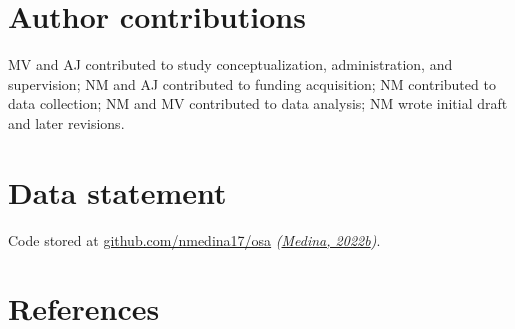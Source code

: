 \documentclass[
  12pt,
]{article}
\begin{document}
\hypertarget{author-contributions}{%
\section*{Author contributions}\label{author-contributions}}

MV and AJ contributed to study conceptualization, administration, and supervision; NM and AJ contributed to funding acquisition; NM contributed to data collection; NM and MV contributed to data analysis;
NM wrote initial draft and later revisions.

\hypertarget{data-statement}{%
\section*{Data statement}\label{data-statement}}

Code stored at \href{github.com/nmedin17/osa}{github.com/nmedina17/osa} \emph{(\protect\hyperlink{ref-softwareMedina22osa}{Medina, 2022b})}.

\newpage

\hypertarget{references}{%
\section*{References}\label{references}}
\end{document}
